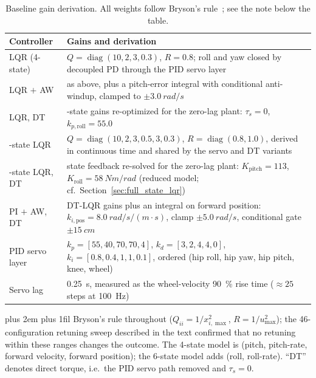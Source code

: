 \documentclass[a4paper,fleqn]{cas-dc}
\newcommand{\tabnote}{\par\leftskip=0pt\rightskip=0pt plus 2em%
  \parfillskip=0pt plus 1fil\relax}
\begin{document}
\begin{table}[pos=!tbp]
\centering
\footnotesize
\caption{Baseline gain derivation. All weights follow Bryson's rule~\cite{bryson1975optimal}; see the note below the table.}
\label{tab:baseline_gains}
\setlength{\tabcolsep}{4pt}
\begin{tabular}{@{}>{\raggedright\arraybackslash}p{1.75cm}>{\raggedright\arraybackslash}p{6.15cm}@{}}
\toprule
Controller & Gains and derivation \\
\midrule
LQR (4-state) & $Q{=}\operatorname{diag}(10,2,3,0.3)$, $R{=}0.8$; roll and yaw closed by decoupled PD through the PID servo layer \\
\addlinespace[2pt]
LQR $+$ AW & as above, plus a pitch-error integral with conditional anti-windup, clamped to $\pm\SI{3.0}{rad/s}$ \\
\addlinespace[2pt]
LQR, DT & 4-state gains re-optimized for the zero-lag plant: $\tau_s{=}0$, $k_{p,\text{roll}}{=}55.0$ \\
\addlinespace[2pt]
6-state LQR & $Q{=}\operatorname{diag}(10,2,3,0.5,3,0.3)$, $R{=}\operatorname{diag}(0.8,1.0)$, derived in continuous time and shared by the servo and DT variants \\
\addlinespace[2pt]
6-state LQR, DT & state feedback re-solved for the zero-lag plant: $K_{\text{pitch}}{=}113$, $K_{\text{roll}}{=}\SI{58}{Nm/rad}$ (reduced model; cf.\ Section~\ref{sec:full_state_lqr}) \\
\addlinespace[2pt]
PI $+$ AW, DT & DT-LQR gains plus an integral on forward position: $k_{i,\text{pos}}{=}\SI{8.0}{rad/s/(m{\cdot}s)}$, clamp $\pm\SI{5.0}{rad/s}$, conditional gate $\pm\SI{15}{cm}$ \\
\addlinespace
PID servo layer & $k_p{=}[55,40,70,70,4]$, $k_d{=}[3,2,4,4,0]$, $k_i{=}[0.8,0.4,1,1,0.1]$, ordered (hip roll, hip yaw, hip pitch, knee, wheel) \\
\addlinespace[2pt]
Servo lag & \SI{0.25}{s}, measured as the wheel-velocity \SI{90}{\percent} rise time ($\approx\num{25}$ steps at \SI{100}{Hz}) \\
\bottomrule
\end{tabular}
\vspace{2pt}\tabnote\noindent\footnotesize
Bryson's rule throughout ($Q_{ii}{=}1/x_{i,\max}^{2}$, $R{=}1/u_{\max}^{2}$); the \num{46}-configuration retuning sweep described in the text confirmed that no retuning within these ranges changes the outcome. The 4-state model is (pitch, pitch-rate, forward velocity, forward position); the 6-state model adds (roll, roll-rate). ``DT'' denotes direct torque, i.e.\ the PID servo path removed and $\tau_s{=}0$.
\end{table}
\end{document}
